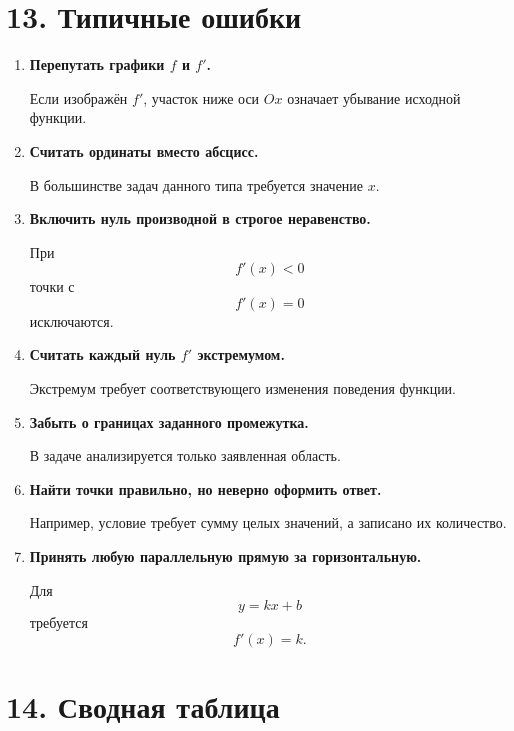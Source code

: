 \documentclass[a4paper,12pt]{article}
\begin{document}
\section*{13. Типичные ошибки}

\begin{enumerate}[leftmargin=8mm]
  \item \textbf{Перепутать графики \(f\) и \(f'\).}

  Если изображён \(f'\), участок ниже оси \(Ox\) означает убывание
  исходной функции.

  \item \textbf{Считать ординаты вместо абсцисс.}

  В большинстве задач данного типа требуется значение \(x\).

  \item \textbf{Включить нуль производной в строгое неравенство.}

  При
  \[
  f'(x)<0
  \]
  точки с
  \[
  f'(x)=0
  \]
  исключаются.

  \item \textbf{Считать каждый нуль \(f'\) экстремумом.}

  Экстремум требует соответствующего изменения поведения функции.

  \item \textbf{Забыть о границах заданного промежутка.}

  В задаче анализируется только заявленная область.

  \item \textbf{Найти точки правильно, но неверно оформить ответ.}

  Например, условие требует сумму целых значений, а записано их количество.

  \item \textbf{Принять любую параллельную прямую за горизонтальную.}

  Для
  \[
  y=kx+b
  \]
  требуется
  \[
  f'(x)=k.
  \]
\end{enumerate}

\section*{14. Сводная таблица}
\end{document}
